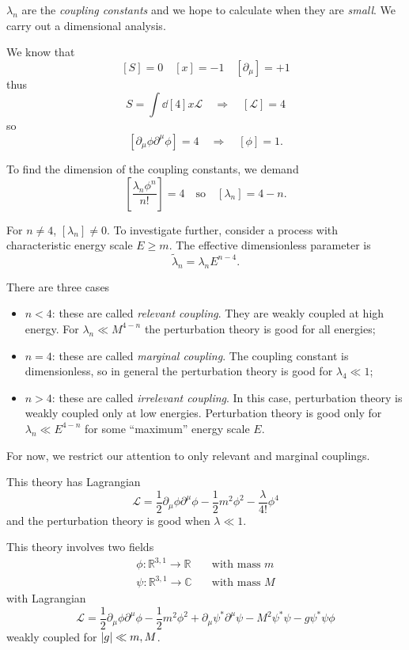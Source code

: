 \documentclass[a4paper,11pt]{article}
\begin{document}
	$\lambda_n$ are the \emph{coupling constants} and we hope to calculate when they are \emph{small}. We carry out a dimensional analysis.  

	We know that
	\[
		[S] = 0 \quad [x] = -1 \quad [\partial_\mu] = +1
	\]
	thus 
	\[
		S = \int \dd[4]{x} \mathcal{L} \quad \Rightarrow \quad [\mathcal{L}] = 4
	\]
	so
	\[
		[\partial_\mu \phi \partial^\mu \phi] = 4 \quad \Rightarrow \quad [\phi] = 1.
	\]
	
	To find the dimension of the coupling constants, we demand
	\[
		\left[ \frac{\lambda_n \phi^n}{n!} \right] = 4 \quad \text{so} \quad [\lambda_n] = 4-n.
	\]
	
	For $n \neq 4$, $[\lambda_n]\neq 0$. To investigate further, consider a process with characteristic energy scale $E \geq m$. The effective dimensionless parameter is
	\[
		\tilde \lambda_n = \lambda_n E ^{n-4}.
	\]
	
	There are three cases
	\begin{itemize}
		\item \underline{$n < 4$}: these are called \emph{relevant coupling}. They are weakly coupled at high energy. For $\lambda_n \ll M ^{4-n}$ the perturbation theory is good for all energies;
		\item \underline{$n = 4$}: these are called \emph{marginal coupling}. The coupling constant is dimensionless, so in general the perturbation theory is good for $\lambda_4 \ll 1$;
		\item \underline{$n > 4$}: these are called \emph{irrelevant coupling}. In this case, perturbation theory is weakly coupled only at low energies. Perturbation theory is good only for $\lambda_n \ll E ^{4-n}$ for some ``maximum'' energy scale $E$. 
	\end{itemize}

	For now, we restrict our attention to only relevant and marginal couplings.

	\begin{ex}
		This theory has Lagrangian 
		\[
			\mathcal{L} = \frac{1}{2} \partial_\mu \phi \partial^\mu \phi - \frac{1}{2} m^2 \phi^2 - \frac{\lambda}{4!} \phi^4
		\]
		and the perturbation theory is good when $\lambda \ll 1$.
	\end{ex}

	\begin{ex}
		This theory involves two fields
		\begin{align*}
			\phi : \mathbb{R}^{3,1} \to \mathbb{R} \quad &\text{with mass } m\\
			\psi : \mathbb{R}^{3,1} \to \mathbb{C} \quad &\text{with mass } M
		\end{align*}
		with Lagrangian
		\[
			\mathcal{L} = \frac{1}{2} \partial_\mu \phi \partial^\mu \phi - \frac{1}{2} m^2 \phi^2 + \partial_\mu \psi^* \partial^\mu \psi - M^2 \psi^* \psi - g \psi^* \psi \phi
		\]
		weakly coupled for $\abs{g} \ll m, M$.
	\end{ex}
\end{document}
